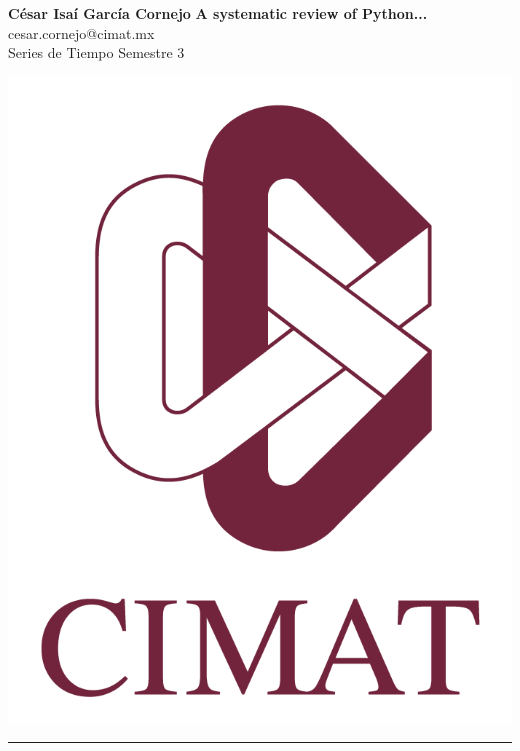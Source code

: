 \documentclass[a4paper, 11pt]{article}
\begin{document}
	\noindent
	
	\begin{minipage}[b][1.2cm][t]{0.8\textwidth}
		\large\textbf{César Isaí García Cornejo} \hfill \textbf{A systematic review of Python...}  \\
		cesar.cornejo@cimat.mx \hfill \\
		\normalsize Series de Tiempo \hfill Semestre 3\\
	\end{minipage}
	
	\hspace{14.4cm}
	\begin{minipage}[b][0.03cm][t]{0.12\linewidth}
		
		\vspace{-2.2cm}
		\includegraphics[scale=0.3]{Figures/EscudoCimat.png}
	\end{minipage}
	
	\noindent\rule{7in}{2.8pt}
	
\end{document}
